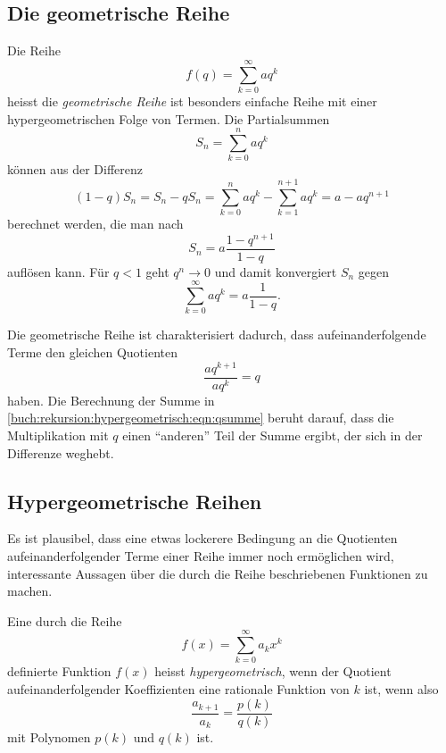 \subsection{Die geometrische Reihe
\label{buch:rekursion:hypergeometrisch:geometrisch}}
Die Reihe
\[
f(q)
=
\sum_{k=0}^\infty aq^k
\]
heisst die {\em geometrische Reihe} ist besonders einfache
Reihe mit einer hypergeometrischen Folge von Termen.
%
%
Die Partialsummen 
\[
S_n
=
\sum_{k=0}^n aq^k
\]
können aus der Differenz
\begin{equation}
(1-q)S_n
=
S_n - qS_n
=
\sum_{k=0}^n aq^k
-
\sum_{k=1}^{n+1} aq^k
=
a -aq^{n+1}
\label{buch:rekursion:hypergeometrisch:eqn:qsumme}
\end{equation}
berechnet werden, die man nach
\begin{equation}
S_n 
=
a\frac{1-q^{n+1}}{1-q}
\label{buch:rekursion:hypergeometrisch:eqn:geomsumme}
\end{equation}
auflösen kann.
Für $q<1$ geht $q^n\to 0$ und damit konvergiert
$S_n$  gegen
\[
\sum_{k=0}^\infty aq^k
=
a\frac{1}{1-q}.
\]

Die geometrische Reihe ist charakterisiert dadurch, dass aufeinanderfolgende
Terme den gleichen Quotienten
\[
\frac{aq^{k+1}}{aq^k}
=
q
\]
haben.
Die Berechnung der Summe in 
\eqref{buch:rekursion:hypergeometrisch:eqn:qsumme}
beruht darauf, dass die Multiplikation mit $q$ einen ``anderen''
Teil der Summe ergibt, der sich in der Differenze weghebt.

%
%
\subsection{Hypergeometrische Reihen
\label{buch:rekursion:hypergeometrisch:reihen}}
Es ist plausibel, dass eine etwas lockerere Bedingung an die
Quotienten aufeinanderfolgender Terme einer Reihe immer noch
ermöglichen wird, interessante Aussagen über die durch die
Reihe beschriebenen Funktionen zu machen.

\begin{definition}
\label{buch:rekursion:hypergeometrisch:def:allg}
Eine durch die Reihe
\[
f(x) = \sum_{k=0}^\infty a_k x^k
\]
definierte Funktion $f(x)$ heisst {\em hypergeometrisch},
wenn der Quotient aufeinanderfolgender
Koeffizienten eine rationale Funktion von $k$ ist,
wenn also
\[
\frac{a_{k+1}}{a_k}
=
\frac{p(k)}{q(k)}
\]
mit Polynomen $p(k)$ und $q(k)$ ist.
\end{definition}

